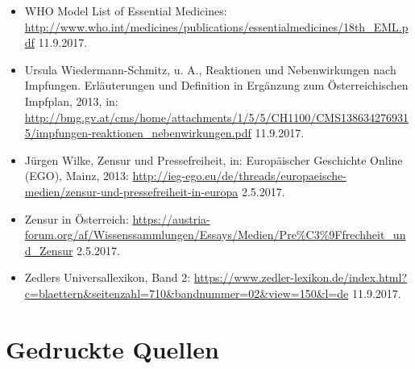 \documentclass[
    a4paper,
    12pt,
    hyphens,
    chapterprefix=true,
    headheight=33pt,
    footheight=29pt,
    headings=optiontohead,
]{scrartcl}
\begin{document}
{\begin{itemize}
\item{WHO Model List of Essential Medicines: \url{http://www.who.int/medicines/publications/essentialmedicines/18th_EML.pdf} 11.9.2017.}
\item{Ursula Wiedermann-Schmitz, u. A., Reaktionen und Nebenwirkungen nach Impfungen. Erläuterungen und Definition in Ergänzung zum Österreichischen Impfplan, 2013, in: \url{http://bmg.gv.at/cms/home/attachments/1/5/5/CH1100/CMS1386342769315/impfungen-reaktionen_nebenwirkungen.pdf} 11.9.2017.}
\item{Jürgen Wilke, Zensur und Pressefreiheit, in: Europäischer Geschichte Online (EGO), Mainz, 2013: \url{http://ieg-ego.eu/de/threads/europaeische-medien/zensur-und-pressefreiheit-in-europa} 2.5.2017.}
\item{Zensur in Österreich: \url{https://austria-forum.org/af/Wissenssammlungen/Essays/Medien/Pre\%C3\%9Ffrechheit_und_Zensur} 2.5.2017.}
\item{Zedlers Universallexikon, Band 2: \url{https://www.zedler-lexikon.de/index.html?c=blaettern&seitenzahl=710&bandnummer=02&view=150&l=de} 11.9.2017.}
\end{itemize}


\section{Gedruckte Quellen}

}
\end{document}
